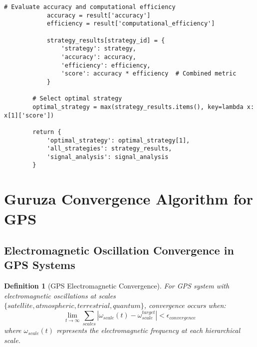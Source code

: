 \documentclass[12pt,a4paper]{article}
\newtheorem{definition}{Definition}
\begin{document}
\begin{lstlisting}[style=pythonstyle, caption=Universal Signal Integration for GPS Enhancement]
            # Evaluate accuracy and computational efficiency
            accuracy = result['accuracy']
            efficiency = result['computational_efficiency']
            
            strategy_results[strategy_id] = {
                'strategy': strategy,
                'accuracy': accuracy,
                'efficiency': efficiency,
                'score': accuracy * efficiency  # Combined metric
            }
        
        # Select optimal strategy
        optimal_strategy = max(strategy_results.items(), key=lambda x: x[1]['score'])
        
        return {
            'optimal_strategy': optimal_strategy[1],
            'all_strategies': strategy_results,
            'signal_analysis': signal_analysis
        }
\end{lstlisting}

\section{Guruza Convergence Algorithm for GPS}

\subsection{Electromagnetic Oscillation Convergence in GPS Systems}

\begin{definition}[GPS Electromagnetic Convergence]
For GPS system with electromagnetic oscillations at scales $\{satellite, atmospheric, terrestrial, quantum\}$, convergence occurs when:
\begin{equation}
\lim_{t \to \infty} \sum_{scales} |\omega_{scale}(t) - \omega_{scale}^{target}| < \epsilon_{convergence}
\end{equation}
where $\omega_{scale}(t)$ represents the electromagnetic frequency at each hierarchical scale.
\end{definition}
\end{document}

